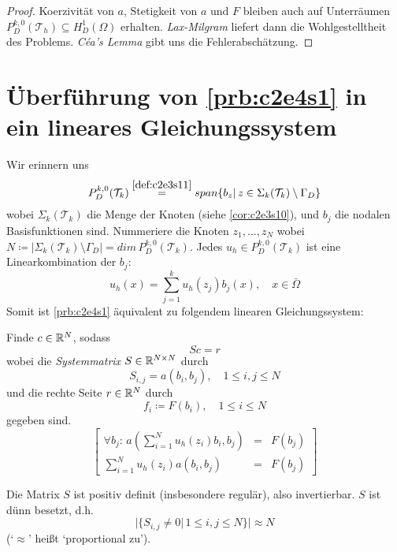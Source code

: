 \documentclass[../skript.tex]{subfiles}
\begin{document}
\begin{proof} %
	Koerzivität von $a$, Stetigkeit von $a$ und $F$ bleiben auch auf Unterräumen \newline\noindent $P^{k,0}_D(\mathcal{T}_h)\subseteq H^1_D(\Omega)$ erhalten. \emph{Lax-Milgram} liefert dann die Wohlgestelltheit des Problems. \emph{Céa's Lemma} gibt uns die Fehlerabschätzung.
\end{proof}

\section*{Überführung von \cref{prb:c2e4s1} in ein lineares Gleichungssystem}

Wir erinnern uns
\[
	P^{k,0}_D(\mathcal{T}_k) \overset{\cref{def:c2e3s11}}= span\{b_z\vert\,z\in\Sigma_k(\mathcal{T}_k)\setminus\Gamma_D\}
\]
wobei $\Sigma_k(\mathcal{T}_k)$ die Menge der Knoten (siehe \cref{cor:c2e3s10}), und $b_j$ die nodalen Basisfunktionen sind. Nummeriere die Knoten $z_1,...,z_N$ wobei $N \coloneqq\vert\Sigma_k(\mathcal{T}_k)\setminus\Gamma_D\vert = dim\,P^{k,0}_D(\mathcal{T}_k)$. Jedes $u_h\in P^{k,0}_D(\mathcal{T}_k)$ ist eine Linearkombination der $b_j$:
\[
	u_h(x) = \sum_{j=1}^k u_h(z_j)b_j(x),\quad x\in\bar{\Omega}
\]
Somit ist \cref{prb:c2e4s1} äquivalent zu folgendem linearen Gleichungssystem:
\begin{problem}
	Finde $c\in\mathbb{R}^N$, sodass 
	\[
		Sc = r
	\]
	wobei die \emph{Systemmatrix} $S\in\mathbb{R}^{N\times N}$ durch
	\[
		S_{i,j} = a(b_i,b_j),\quad 1\leq i,j\leq N
	\]
	und die rechte Seite $r\in\mathbb{R}^N$ durch
	\[
		f_i\coloneqq F(b_i),\quad 1\leq i\leq N
	\]
	gegeben sind.
	\begin{equation*}
		\left[ 
			\begin{aligned}
				\forall b_j:\,a\left(\sum_{i=1}^N u_h(z_i)b_i,b_j\right) &=& F(b_j)\\
				\sum_{i=1}^N u_h(z_i) a(b_i,b_j) &=& F(b_j)
			\end{aligned}
		\right]
	\end{equation*}
\end{problem}

\begin{remark}\label{rem:c2e4s2}
	Die Matrix $S$ ist positiv definit (insbesondere regulär), also invertierbar. $S$ ist dünn besetzt, d.h.
	\[
		\vert \{ S_{i,j} \not=0\vert\, 1\leq i,j\leq N\}\vert \approx N
	\]
	(`$\approx$' heißt `proportional zu').
\end{remark}
\end{document}
